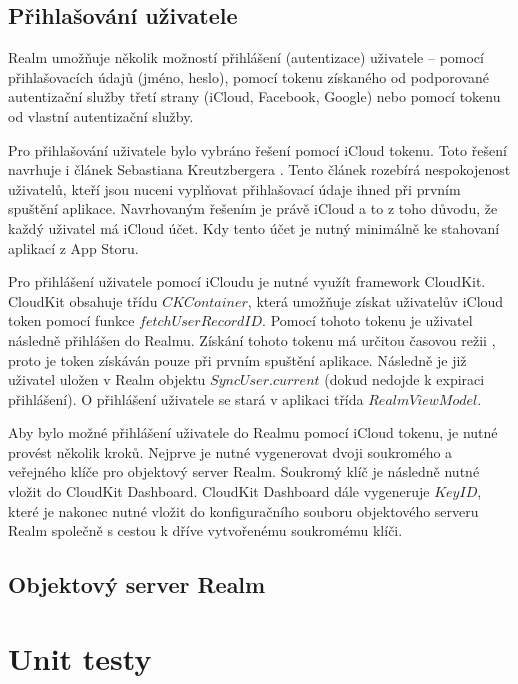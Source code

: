 \documentclass[thesis=M,czech]{FITthesis}[2012/06/26]
\begin{document}
\subsection{Přihlašování uživatele}
\label{chap:login}
Realm umožňuje několik možností přihlášení (autentizace) uživatele -- pomocí přihlašovacích údajů (jméno, heslo), pomocí tokenu získaného od podporované autentizační služby třetí strany (iCloud, Facebook, Google) nebo pomocí tokenu od vlastní autentizační služby. \cite{realmDocs}

Pro přihlašování uživatele bylo vybráno řešení pomocí iCloud tokenu. Toto řešení navrhuje i článek Sebastiana Kreutzbergera \cite{loginUX}. Tento článek rozebírá nespokojenost uživatelů, kteří jsou nuceni vyplňovat přihlašovací údaje ihned při prvním spuštění aplikace. Navrhovaným řešením je právě iCloud a to z toho důvodu, že každý uživatel má iCloud účet.  Kdy tento účet je nutný minimálně ke stahovaní aplikací z App Storu.

Pro přihlášení uživatele pomocí iCloudu je nutné využít framework CloudKit. CloudKit obsahuje třídu $CKContainer$, která umožňuje získat uživatelův iCloud token pomocí funkce $fetchUserRecordID$. \cite{ckcontainer} Pomocí tohoto tokenu je uživatel následně přihlášen do Realmu. Získání tohoto tokenu má určitou časovou režii \cite{ckcontainer}, proto je token získáván pouze při prvním spuštění aplikace. Následně je již uživatel uložen v Realm objektu $SyncUser.current$ (dokud nedojde k expiraci přihlášení). O přihlášení uživatele se stará v aplikaci třída $RealmViewModel$.

Aby bylo možné přihlášení uživatele do Realmu pomocí iCloud tokenu, je nutné provést několik kroků. Nejprve je nutné vygenerovat dvoji soukromého a veřejného klíče pro objektový server Realm. Soukromý klíč je následně nutné vložit do CloudKit Dashboard. CloudKit Dashboard dále vygeneruje $Key ID$, které je nakonec nutné vložit do konfiguračního souboru objektového serveru Realm společně s cestou k dříve vytvořenému soukromému klíči. \cite{realmObjS}

\subsection{Objektový server Realm}

\section{Unit testy}
\end{document}
